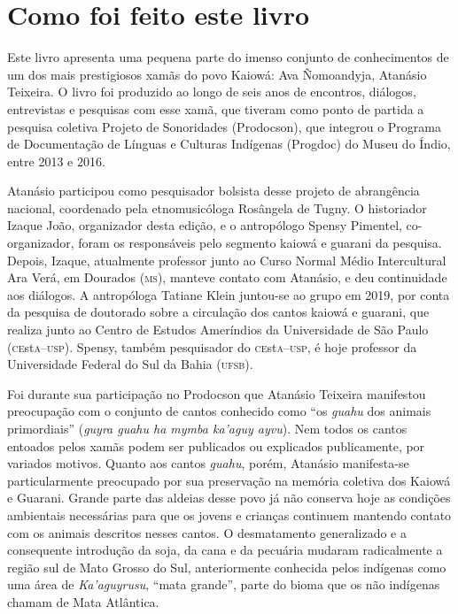 \chapter{Como foi feito este livro}

Este livro apresenta uma pequena parte do imenso conjunto de
conhecimentos de um dos mais prestigiosos xamãs do povo Kaiowá: Ava
Ñomoandyja, Atanásio Teixeira. O livro foi produzido ao longo de seis
anos de encontros, diálogos, entrevistas e pesquisas com esse xamã, que
tiveram como ponto de partida a pesquisa coletiva Projeto de Sonoridades
(Prodocson), que integrou o Programa de Documentação de Línguas e
Culturas Indígenas (Progdoc) do Museu do Índio, entre 2013 e 2016.

Atanásio participou como pesquisador bolsista desse projeto de
abrangência nacional, coordenado pela etnomusicóloga Rosângela de Tugny.
O historiador Izaque João, organizador desta edição, e o antropólogo
Spensy Pimentel, co-organizador, foram os responsáveis pelo segmento
kaiowá e guarani da pesquisa. Depois, Izaque, atualmente
professor junto ao Curso Normal Médio Intercultural Ara Verá, em
Dourados (\textsc{ms}), manteve contato com Atanásio, e deu continuidade aos
diálogos. A antropóloga Tatiane Klein juntou-se ao grupo em 2019, por
conta da pesquisa de doutorado sobre a circulação dos cantos kaiowá e
guarani, que realiza junto ao Centro de Estudos Ameríndios da
Universidade de São Paulo (\textsc{ce}st\textsc{a}--\textsc{usp}). Spensy, também pesquisador do
\textsc{ce}st\textsc{a}--\textsc{usp}, é hoje professor da Universidade Federal do Sul da Bahia
(\textsc{ufsb}).

Foi durante sua participação no Prodocson que Atanásio Teixeira
manifestou preocupação com o conjunto de cantos conhecido como ``os
\textit{guahu} dos animais primordiais'' (\textit{guyra guahu ha
mymba ka'aguy ayvu}). Nem todos os cantos entoados pelos xamãs podem ser
publicados ou explicados publicamente, por variados motivos. Quanto aos
cantos \textit{guahu}, porém, Atanásio manifesta-se particularmente
preocupado por sua preservação na memória coletiva dos Kaiowá e Guarani.
Grande parte das aldeias desse povo já não conserva hoje as condições
ambientais necessárias para que os jovens e crianças continuem mantendo
contato com os animais descritos nesses cantos. O desmatamento
generalizado e a consequente introdução da soja, da cana e da pecuária
mudaram radicalmente a região sul de Mato Grosso do Sul, anteriormente
conhecida pelos indígenas como uma área de \textit{Ka'aguyrusu}, ``mata
grande'', parte do bioma que os não indígenas chamam de Mata Atlântica.

